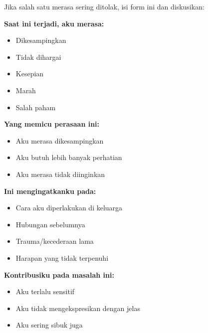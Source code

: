 \begin{exercisebox}
Jika salah satu merasa sering ditolak, isi form ini dan diskusikan:

\textbf{Saat ini terjadi, aku merasa:}
\begin{itemize}
    \item[$\square$] Dikesampingkan
    \item[$\square$] Tidak dihargai
    \item[$\square$] Kesepian
    \item[$\square$] Marah
    \item[$\square$] Salah paham
\end{itemize}

\textbf{Yang memicu perasaan ini:}
\begin{itemize}
    \item[$\square$] Aku merasa dikesampingkan
    \item[$\square$] Aku butuh lebih banyak perhatian
    \item[$\square$] Aku merasa tidak diinginkan
\end{itemize}

\textbf{Ini mengingatkanku pada:}
\begin{itemize}
    \item[$\square$] Cara aku diperlakukan di keluarga
    \item[$\square$] Hubungan sebelumnya
    \item[$\square$] Trauma/kecederaan lama
    \item[$\square$] Harapan yang tidak terpenuhi
\end{itemize}

\textbf{Kontribusiku pada masalah ini:}
\begin{itemize}
    \item[$\square$] Aku terlalu sensitif
    \item[$\square$] Aku tidak mengekspresikan dengan jelas
    \item[$\square$] Aku sering sibuk juga
\end{itemize}
\end{exercisebox}
